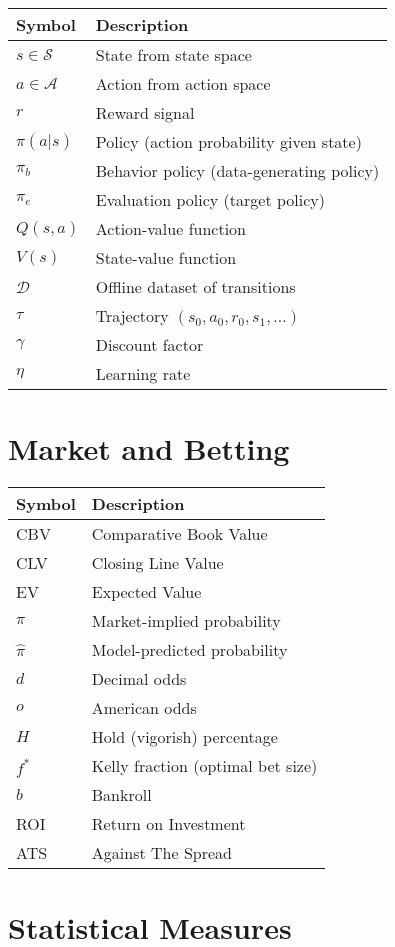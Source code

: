 \begin{tabular}{ll}
\toprule
\textbf{Symbol} & \textbf{Description} \\
\midrule
$s \in \mathcal{S}$ & State from state space \\
$a \in \mathcal{A}$ & Action from action space \\
$r$ & Reward signal \\
$\pi(a|s)$ & Policy (action probability given state) \\
$\pi_b$ & Behavior policy (data-generating policy) \\
$\pi_e$ & Evaluation policy (target policy) \\
$Q(s,a)$ & Action-value function \\
$V(s)$ & State-value function \\
$\mathcal{D}$ & Offline dataset of transitions \\
$\tau$ & Trajectory $(s_0, a_0, r_0, s_1, ...)$ \\
$\gamma$ & Discount factor \\
$\eta$ & Learning rate \\
\bottomrule
\end{tabular}

\section*{Market and Betting}

\begin{tabular}{ll}
\toprule
\textbf{Symbol} & \textbf{Description} \\
\midrule
CBV & Comparative Book Value \\
CLV & Closing Line Value \\
EV & Expected Value \\
$\pi$ & Market-implied probability \\
$\hat{\pi}$ & Model-predicted probability \\
$d$ & Decimal odds \\
$o$ & American odds \\
$H$ & Hold (vigorish) percentage \\
$f^*$ & Kelly fraction (optimal bet size) \\
$b$ & Bankroll \\
ROI & Return on Investment \\
ATS & Against The Spread \\
\bottomrule
\end{tabular}

\section*{Statistical Measures}

